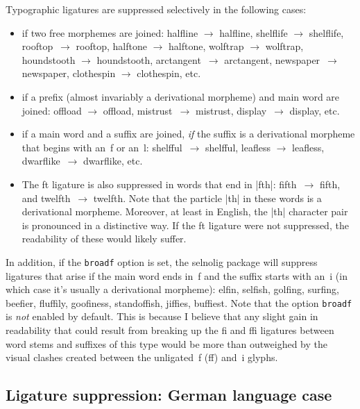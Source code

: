 \documentclass[11pt]{article}
\newcommand{\pkg}[1]{\textsf{#1}}
\newcommand{\opt}[1]{\texttt{#1}}
\begin{document}
Typographic ligatures are suppressed selectively in the following cases:
\begin{itemize}
\item if two free morphemes are joined: \mbox{halfline} $\to$ halfline, \mbox{shelflife} $\to$ shelflife, \mbox{rooftop}~$\to$ rooftop, \mbox{halftone} $\to$ halftone, \mbox{wolftrap} $\to$ wolftrap, \mbox{houndstooth} $\to$ houndstooth, \mbox{arctan}\-gent~$\to$ arctangent, \mbox{newspaper}~$\to$ newspaper, \mbox{clothespin} $\to$ clothespin, etc.

\item if a prefix (almost invariably a derivational morpheme) and main word are joined: \mbox{offload} $\to$ offload, mi\mbox{st}rust~$\to$ mistrust, di\mbox{sp}lay~$\to$ display, etc. 

\item if a main word and a suffix are joined, \emph{if} the suffix is a derivational morpheme that begins with an~f or an~l: \mbox{shelfful}~$\to$ shelfful, \mbox{leafless} $\to$ leafless, \mbox{dwarflike}~$\to$ dwarflike, etc. 

\item The ft ligature is also suppressed in words that end in |fth|: \mbox{fifth}~$\to$ fifth, and \mbox{twelfth}~$\to$ twelfth. Note that the particle |th| in these words is a derivational morpheme. Moreover, at least in English, the |th| character pair is pronounced in a distinctive way. If the ft ligature were not suppressed, the readability of these would likely suffer.
\end{itemize}

In addition, if the \opt{broadf} option is set, the \pkg{selnolig} package will suppress ligatures that arise if the main word ends in~f and the suffix starts with an~i (in which case it's usually a derivational morpheme): elfin, selfish, golfing, surfing, beefier, fluffily, goofiness, standoffish, jiffies, buffiest. Note that the option \opt{broadf} is \emph{not} enabled by default. This is because I believe that any slight gain in readability that could result from breaking up the fi and ffi ligatures between word stems and suffixes of this type would be more than outweighed by the visual clashes created between the unligated~f (ff) and~i glyphs. 



\subsection{Ligature suppression: German language case}
\end{document}
